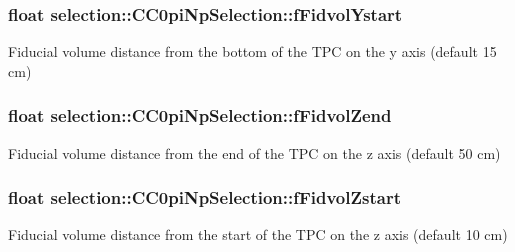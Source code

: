\subsubsection[{\texorpdfstring{f\+Fidvol\+Ystart}{fFidvolYstart}}]{\setlength{\rightskip}{0pt plus 5cm}float selection\+::\+C\+C0pi\+Np\+Selection\+::f\+Fidvol\+Ystart\hspace{0.3cm}{\ttfamily [private]}}\hypertarget{classselection_1_1CC0piNpSelection_ac59a66f695af8314018029e4480db16a}{}\label{classselection_1_1CC0piNpSelection_ac59a66f695af8314018029e4480db16a}
Fiducial volume distance from the bottom of the T\+PC on the y axis (default 15 cm) 
\subsubsection[{\texorpdfstring{f\+Fidvol\+Zend}{fFidvolZend}}]{\setlength{\rightskip}{0pt plus 5cm}float selection\+::\+C\+C0pi\+Np\+Selection\+::f\+Fidvol\+Zend\hspace{0.3cm}{\ttfamily [private]}}\hypertarget{classselection_1_1CC0piNpSelection_a9ac28bcb4ef95573d416dec35202b18e}{}\label{classselection_1_1CC0piNpSelection_a9ac28bcb4ef95573d416dec35202b18e}
Fiducial volume distance from the end of the T\+PC on the z axis (default 50 cm) 
\subsubsection[{\texorpdfstring{f\+Fidvol\+Zstart}{fFidvolZstart}}]{\setlength{\rightskip}{0pt plus 5cm}float selection\+::\+C\+C0pi\+Np\+Selection\+::f\+Fidvol\+Zstart\hspace{0.3cm}{\ttfamily [private]}}\hypertarget{classselection_1_1CC0piNpSelection_afe5a2b82ecad103b98362839094c47e0}{}\label{classselection_1_1CC0piNpSelection_afe5a2b82ecad103b98362839094c47e0}
Fiducial volume distance from the start of the T\+PC on the z axis (default 10 cm) 
